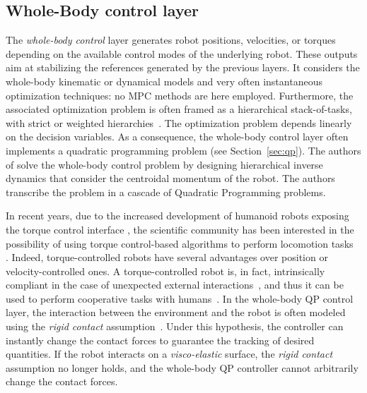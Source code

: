 \subsection{Whole-Body control layer\label{sec:wbc_soa}}
The \emph{whole-body control} layer generates robot positions, velocities, or torques depending on the available control modes of the underlying robot. These outputs aim at stabilizing the references generated by the previous layers. It considers the whole-body kinematic or dynamical models and very often instantaneous optimization techniques: no MPC methods are here employed. Furthermore, the associated optimization problem is often framed as a hierarchical stack-of-tasks, with strict or weighted hierarchies~\citep{Stephens2010PushJoints,nava16}. 
The optimization problem depends linearly on the decision variables. As a consequence, the whole-body control layer often implements a quadratic programming problem (see Section~\ref{sec:qp}).
The authors of \citep{Herzog2016} solve the whole-body control problem by designing hierarchical inverse dynamics that consider the centroidal momentum of the robot. The authors transcribe the problem in a cascade of Quadratic Programming problems. 
\par
In recent years, due to the increased development of humanoid robots exposing the torque control interface \citep{Stasse2017TALOS:Applications,Englsberger2015OverviewTORO,Kaneko2019HumanoidJoints}, the scientific community has been interested in the possibility of using torque control-based algorithms to perform locomotion tasks~ \citep{stephens2010,Lee2016,Feng2015a,Kuindersma2016,koolen2012capturability,Ramuzat2021ComparisonTALOS,Englsberger2018,Ramuzat2022PassiveMulti-Contact}. Indeed, torque-controlled robots have several advantages over position or velocity-controlled ones. A torque-controlled robot is, in fact, intrinsically compliant in the case of unexpected external interactions~\citep{Fahmi2019PassiveTerrain,Mesesan2019,Henze2016}, and thus it can be used to perform cooperative tasks with humans~\citep{Romano2018,Tirupachuri2020TowardsInteractions,Sheridan2016HumanRobotInteraction}.
In the whole-body QP control layer, the interaction between the environment and the robot is often modeled using the \emph{rigid contact} assumption~\citep{nava16,Hopkins2015b,Herzog2016}. Under this hypothesis, the controller can instantly change the contact forces to guarantee the tracking of desired quantities. 
If the robot interacts on a \emph{visco-elastic} surface, the \emph{rigid contact} assumption no longer holds, and the whole-body QP controller cannot arbitrarily change the contact forces.
